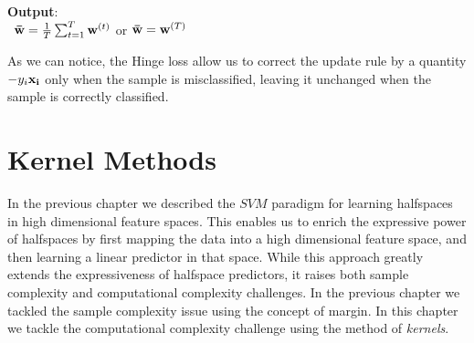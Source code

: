 \documentclass[12pt]{report}
\theoremstyle{plain}
\begin{document}
\begin{flushleft}
\begin{tcolorbox}
	\textbf{Output}:\\
	\-\ \qquad $\vb{\bar{w}}=\frac{1}{T}\sum_{t=1}^T\vb{w}^{(t)}$ or $\vb{\bar{w}}=\vb{w}^{(T)}$
	
	\label{box:SGD_for_Soft_SVM}
\end{tcolorbox}
As we can notice, the Hinge loss allow us to correct the update rule by a quantity $-y_i\vb{x_i}$ only when the sample is misclassified, leaving it unchanged when the sample is correctly classified. 


\chapter{Kernel Methods}
In the previous chapter we described the $SVM$ paradigm for learning halfspaces in high dimensional feature spaces. This enables us to enrich the expressive power of halfspaces by first mapping the data into a high dimensional feature space, and then learning a linear predictor in that space. While this approach greatly extends the expressiveness of halfspace predictors, it raises both sample complexity and computational complexity challenges. In the previous chapter we tackled the sample complexity issue using the concept of margin. In this chapter we tackle the computational complexity challenge using the method of \textit{kernels}.\\


\end{flushleft}
\end{document}
